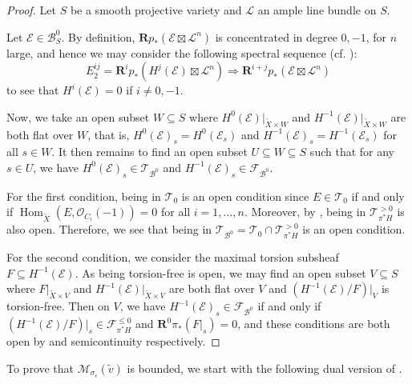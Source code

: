 \documentclass[12pt]{amsart}
\theoremstyle{definition}
\DeclareMathOperator{\Hom}{Hom}
\begin{document}
\begin{proof}
Let $S$ be a smooth projective variety and $\mathcal{L}$ an ample line bundle on $S$.

Let $\mathcal{E} \in \mathcal{B}^0_S$.
By definition, $\mathbf{R}p_\ast (\mathcal{E} \boxtimes \mathcal{L}^n)$ is concentrated in degree $0,-1$, for $n$ large,
and hence we may consider the following spectral sequence (cf. \cite[Lemma 4.7]{Tod08}):
\[ E^{ij}_2= \mathbf{R}^ip_\ast   (H^j(\mathcal{E})\boxtimes \mathcal{L}^n
) \Longrightarrow \mathbf{R}^{i+j}p_\ast
(\mathcal{E}\boxtimes \mathcal{L}^n)
\]
to see that $H^i(\mathcal{E})=0$ if $i\neq 0,-1$.

Now, we take an open subset $W \subseteq S$ where $H^0(\mathcal{E})|_{\widetilde{X}\times W}$ and $H^{-1}(\mathcal{E})|_{\widetilde{X}\times W}$ are both flat over $W$, that is,
$H^0(\mathcal{E})_s=H^0(\mathcal{E}_s)$ and $H^{-1}(\mathcal{E})_s = H^{-1}(\mathcal{E}_s)$ for all $s \in W$.
It then remains to find an open subset $U \subseteq W \subseteq S$ such that for any $s \in U$, we have $H^0(\mathcal{E})_s \in \mathcal{T}_{\mathcal{B}^0}$ and $H^{-1}(\mathcal{E})_s \in \mathcal{F}_{\mathcal{B}^0}$.

For the first condition, being in $\mathcal{T}_0$ is an open condition since $E \in \mathcal{T}_0$ if and only if $\Hom_{\widetilde{X}}(E,\mathcal{O}_{C_i}(-1))=0$ for all $i=1,\dots, n$.
Moreover, by \cite[Lemma 4.7]{Tod08}, being in $\mathcal{T}^{>0}_{\pi^\ast H}$ is also open.
Therefore, we see that being in $\mathcal{T}_{\mathcal{B}^0}=\mathcal{T}_0\cap \mathcal{T}^{>0}_{\pi^\ast H}$ is an open condition.

For the second condition, we consider the maximal torsion subsheaf $F \subseteq H^{-1}(\mathcal{E})$. 
As being torsion-free is open,
we may find an open subset $V \subseteq S$ where  $F|_{\widetilde{X}\times V}$ and $H^{-1}(\mathcal{E})|_{\widetilde{X}\times V}$ are both flat over $V$ and $(H^{-1}(\mathcal{E})/F)|_V$ is torsion-free.
Then on $V$, we have $H^{-1}(\mathcal{E})_s \in \mathcal{F}_{\mathcal{B}^0}$ if and only if $(H^{-1}(\mathcal{E})/F)|_s \in \mathcal{F}^{\leq 0}_{\pi^\ast H}$ and $\mathbf{R}^0\pi_\ast (F|_s)=0$,
and these conditions are both open by \cite[Lemma 4.7]{Tod08} and semicontinuity respectively.
\end{proof}

To prove that $\mathcal{M}_{\sigma_\epsilon}(\widetilde{v})$ is bounded,
we start with the following dual version of \cite[Lemma 5.9]{BM11}.
\end{document}
